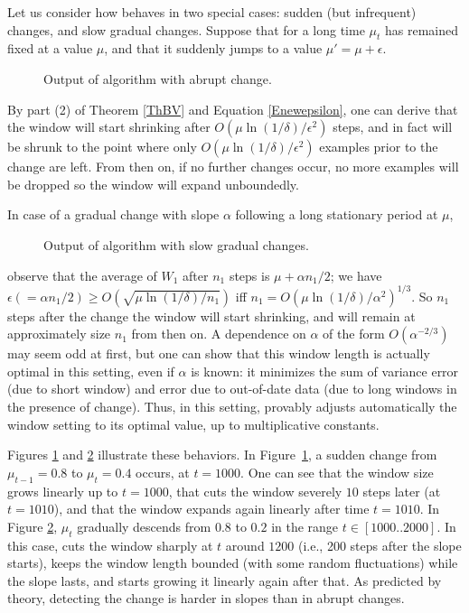 Let us consider how \adwinz behaves in two special cases: sudden (but infrequent)
changes, and slow gradual changes. Suppose that for a long time $\mu_t$ has remained
fixed at a value $\mu$, and that it suddenly jumps to a value $\mu'=\mu+\epsilon$. 
\begin{figure}[t]
      \begin{center}
        
      \end{center}
\caption{Output of algorithm \adwinz with abrupt change.} 
  \label{fig:ADWIN-E}
\end{figure}
By part (2) of Theorem \ref{ThBV} and Equation \ref{Enewepsilon}, one can derive that 
the window will start shrinking after $O(\mu \ln(1/\delta) / \epsilon^2)$ steps, and 
in fact will be shrunk to the point where only $O(\mu \ln(1/\delta) / \epsilon^2)$ examples
prior to the change are left. From then on, if no further changes occur, no more examples
will be dropped so the window will expand unboundedly.


In case of a gradual change with slope $\alpha$ following
a long stationary period at $\mu$, 
\begin{figure}[t]
	\begin{center}
		
	\end{center}
\caption{Output of algorithm \adwinz with slow gradual changes.}
  \label{fig:ADWIN-R} 
\end{figure}
observe that the average of $W_1$ after $n_1$ steps
is $\mu + \alpha n_1 /2$; we have $\epsilon (=\alpha n_1/2) \ge O(\sqrt{\mu \ln(1/\delta) /n_1})$
iff $n_1 = O(\mu \ln(1/\delta) / \alpha^{2})^{1/3}$. So $n_1$ steps after the change
the window will start shrinking, and will remain at approximately size $n_1$ from then on. 
A dependence on $\alpha$ of the form $O(\alpha^{-2/3})$ may seem odd at first, but one can show
that this window length is actually optimal in this setting, even if $\alpha$ is known: 
it minimizes the sum of variance error (due to short window) and 
error due to out-of-date data (due to long windows in the presence of change). 
Thus, in this setting, \adwinz provably adjusts automatically
the window setting to its optimal value, up to multiplicative constants. 

Figures \ref{fig:ADWIN-E} and \ref{fig:ADWIN-R} illustrate these behaviors. 
In Figure~\ref{fig:ADWIN-E}, a sudden change from $\mu_{t-1}=0.8$ to $\mu_t=0.4$ occurs, 
at $t=1000$. 
One can see that the window size grows linearly up to $t=1000$, 
that \adwinz cuts the window severely $10$ steps later (at $t=1010$), and
that the window expands again linearly after time $t=1010$. 
In Figure \ref{fig:ADWIN-R}, $\mu_t$ gradually descends from $0.8$ to $0.2$
in the range $t\in [1000..2000]$. In this case, \adwinz cuts the window sharply 
at $t$ around $1200$ (i.e., 200 steps after the slope starts), keeps the window length
bounded (with some random fluctuations) while the slope lasts, and starts growing
it linearly again after that. As predicted by theory, detecting the
change is harder in slopes than in abrupt changes. 

